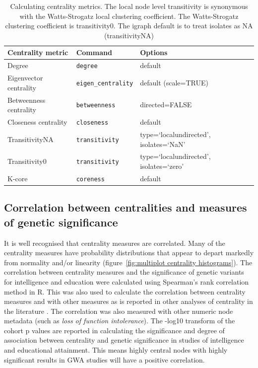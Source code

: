 \begin{table}[]
    \centering
    \begin{tabular}{llll}
    \toprule
        Centrality metric & Command & Options   \\
        \midrule
         Degree & \texttt{degree} & default   \\
         Eigenvector centrality & \texttt{eigen\_centrality} & default (scale=TRUE) \\
         Betweenness centrality & \texttt{betweenness} & directed=FALSE  \\
         Closeness centrality & \texttt{closeness} & default \\
         TransitivityNA & \texttt{transitivity} & type=`localundirected', isolates=`NaN'   \\
         Transitivity0 & \texttt{transitivity} & type=`localundirected', isolates=`zero'\\
         K-core & \texttt{coreness} & default  \\
         \bottomrule
    \end{tabular}
    \caption[Methods for calculating centrality measures]{Calculating centrality metrics. The local node level transitivity is synonymous with the Watts-Strogatz local clustering coefficient. The Watts-Strogatz clustering coefficient is transitivity0. The igraph default is to treat isolates as NA (transitivityNA)}
    \label{tab:calculating centrality metrics}
\end{table}


\subsection{Correlation between centralities and measures of genetic significance}
\label{Correlation between centralities}
It is well recognised that centrality measures are correlated. Many of the centrality measures have probability distributions that appear to depart markedly from normality and/or linearity (figure~\ref{fig:multiplot centrality histograms}). The correlation between centrality measures and the significance of genetic variants for intelligence and education were calculated using Spearman's rank correlation method in R. This was also used to calculate the correlation between centrality measures and with other measures as is reported in other analyses of centrality in the literature \cite{oldham2019consistency}. The correlation was also measured with other numeric node metadata (such as \textit{loss of function intolerance}).  The -log10 transform of the cohort p values are reported in calculating the significance and degree of association between centrality and genetic significance in studies of intelligence and educational attainment. This means highly central nodes with highly significant results in GWA studies will have a positive correlation. 


